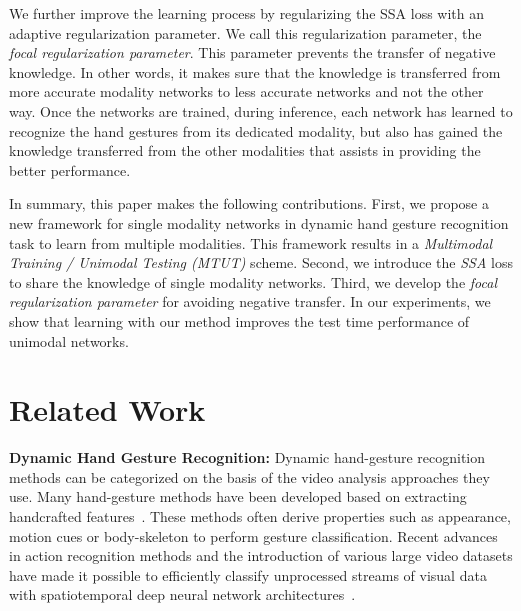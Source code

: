 \documentclass[10pt,twocolumn,letterpaper]{article}
\begin{document}
We further improve the learning process by regularizing the SSA loss with an adaptive regularization parameter.  We call this regularization parameter, the \emph{focal regularization parameter}.  This parameter prevents the transfer of negative knowledge.  In other words, it makes sure that the knowledge is transferred from more accurate modality networks to less accurate networks and not the other way.  Once the networks are trained, during inference, each network has learned to recognize the hand gestures from its dedicated modality, but also has gained the knowledge transferred from the other modalities that assists in providing the better performance.  

In summary, this paper makes the following contributions. First, we propose a new framework for single modality networks in dynamic hand gesture recognition task to learn from multiple modalities.  This framework results in a \emph{Multimodal Training / Unimodal Testing (MTUT)} scheme.   Second, we introduce the \emph{SSA} loss to share the knowledge of single modality networks.   Third,  we develop the \emph{focal regularization parameter} for avoiding negative transfer.   In our experiments, we show that learning with our method improves the test time performance of unimodal networks.  





\section{Related Work}\label{sec:relatedwork}
\noindent \textbf{Dynamic Hand Gesture Recognition:}
Dynamic hand-gesture recognition methods can be categorized on the basis of the video analysis approaches they use.  Many hand-gesture methods have been developed based on extracting handcrafted features~\cite{wang2012robust,shen2012dynamic,tamrakar2012evaluation,ohn2014hand}.  These methods often derive properties such as appearance, motion cues or body-skeleton to perform gesture classification.    Recent advances in action recognition methods and the introduction  of various large video datasets have made it possible to efficiently classify unprocessed streams of visual data with spatiotemporal deep neural network architectures~\cite{carreira2017quo,tran2015learning,simonyan2014two}.    
\end{document}
